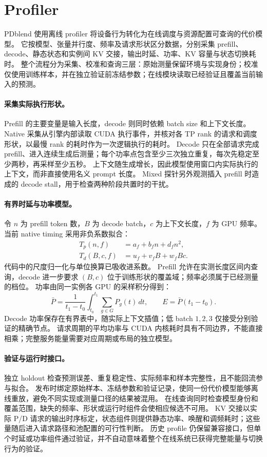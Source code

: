 \section{Profiler}
PDblend 使用离线 profiler 将设备行为转化为在线调度与资源配置可查询的代价模型。
它按模型、张量并行度、频率及请求形状区分数据，分别采集 prefill、decode、静态状态和实例间 KV 交接，输出时延、功率、KV 容量与状态切换耗时。
整个流程分为采集、校准和查询三层：原始测量保留环境与实现身份；校准仅使用训练样本，并在独立验证前冻结参数；在线模块读取已经验证且覆盖当前输入的预测。

\paragraph{采集实际执行形状。}
Prefill 的主要变量是输入长度，decode 则同时依赖 batch size 和上下文长度。
Native 采集从引擎内部读取 CUDA 执行事件，并核对各 TP rank 的请求和调度形状，以最慢 rank 的耗时作为一次逻辑执行的耗时。
Decode 只在全部请求完成 prefill、进入连续生成后测量；每个功率点包含至少三次独立重复，每次先稳定至少两秒，再采样至少五秒。
上下文随生成增长，因此模型使用窗口内实际执行的上下文，而非直接使用名义 prompt 长度。
Mixed 探针另外观测插入 prefill 时造成的 decode stall，用于检查两种阶段共置时的干扰。

\paragraph{有界时延与功率模型。}
令 $n$ 为 prefill token 数，$B$ 为 decode batch，$c$ 为上下文长度，$f$ 为 GPU 频率。
当前 native timing 采用非负系数拟合：
\begin{align}
T_p(n,f)&=a_f+b_fn+d_fn^2,\label{eq:profile-prefill}\\
T_d(B,c,f)&=u_f+v_fB+w_fBc.\label{eq:profile-decode}
\end{align}
代码中的尺度归一化与单位换算已吸收进系数。
Prefill 允许在实测长度区间内查询，decode 进一步要求 $(B,c)$ 位于训练形状的覆盖域；频率必须属于已经测量的档位。
功率由同一实例各 GPU 的采样积分得到：
\begin{equation}
\bar P=\frac{1}{t_1-t_0}\int_{t_0}^{t_1}\sum_{g\in G}P_g(t)\,dt,
\qquad E=\bar P(t_1-t_0).
\label{eq:profile-energy}
\end{equation}
Decode 功率保存在有界表中，随实际上下文插值；低 batch $1,2,3$ 仅接受分别验证的精确节点。
请求周期的平均功率与 CUDA 内核耗时具有不同边界，不能直接相乘；完整服务能量需要对应周期或布局的独立模型。

\paragraph{验证与运行时接口。}
独立 holdout 检查预测误差、重复稳定性、实际频率和样本完整性，且不能回流参与拟合。
发布时绑定原始样本、冻结参数和验证记录，使同一份代价模型能够离线重放，避免不同实现或测量口径的结果被混用。
在线查询同时检查模型身份和覆盖范围，缺失的频率、形状或运行时组件会使相应候选不可用。
KV 交接以实际 P/D 请求的输出时序标定，状态组件则提供静态功率、唤醒和调频耗时；这些量随后进入请求路径和池配置的可行性判断。
历史 profile 仍保留兼容接口，但单个时延或功率组件通过验证，并不自动意味着整个在线系统已获得完整能量与切换行为的验证。

